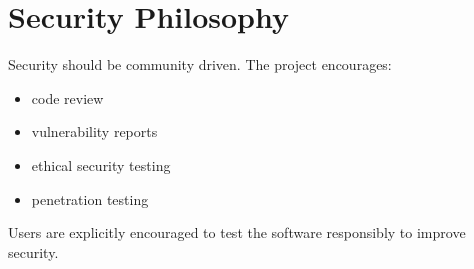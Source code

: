 
\chapter{Security Philosophy}

Security should be community driven. The project encourages:
\begin{itemize}
	\item code review
	\item vulnerability reports
	\item ethical security testing
	\item penetration testing
\end{itemize}
Users are explicitly encouraged to test the software responsibly to improve security.

\sentinelchapterend
